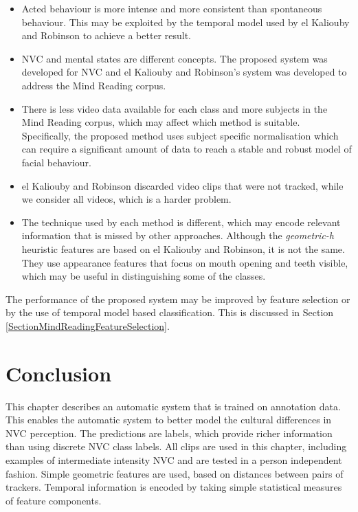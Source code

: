 \begin{itemize}
 \item Acted behaviour is more intense and more consistent than spontaneous behaviour. This may be exploited by the temporal model used by el Kaliouby and Robinson to achieve a better result.
 \item \ac{NVC} and mental states are different concepts. The proposed system was developed for \ac{NVC} and el Kaliouby and Robinson's system was developed to address the Mind Reading corpus.
 \item There is less video data available for each class and more subjects in the Mind Reading corpus, which may affect which method is suitable. Specifically, the proposed method uses subject specific normalisation which can require a significant amount of data to reach a stable and robust model of facial behaviour.
 \item el Kaliouby and Robinson discarded video clips that were not tracked, while we consider all videos, which is a harder problem.
 \item The \featureGeneration technique used by each method is different, which may encode relevant information that is missed by other \featureGeneration approaches. Although the \textit{geometric-h} heuristic features are based on el Kaliouby and Robinson, it is not the same. They use appearance features that focus on mouth opening and teeth visible, which may be useful in distinguishing some of the classes.
\end{itemize}

The performance of the proposed system may be improved by feature selection or by the use of temporal model based classification. This is discussed in Section \ref{SectionMindReadingFeatureSelection}.

\section{Conclusion}

This chapter describes an automatic system that is trained on \culturallySpecific annotation data. This enables the automatic system to better model the cultural differences in \ac{NVC} perception. The predictions are \continuous labels, which provide richer information than using discrete \ac{NVC} class labels. All clips are used in this chapter, including examples of intermediate intensity \ac{NVC} and are tested in a person independent fashion. Simple geometric features are used, based on distances between pairs of trackers. Temporal information is encoded by taking simple statistical measures of feature components. %

